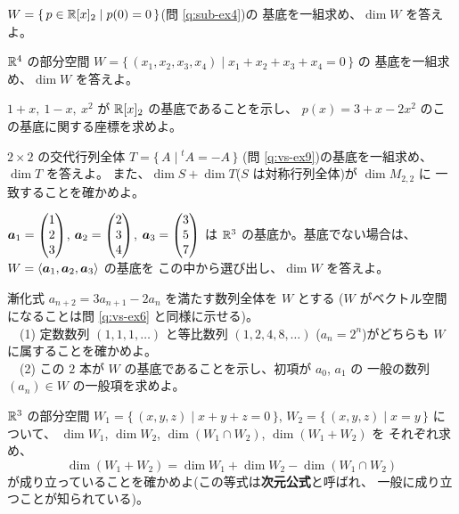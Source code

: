 \begin{mondai}[基本]\label{q:dim-ex4}
$W = \{\, p \in \mathbb{R}[x]_2 \mid p(0) = 0 \,\}$(問 \ref{q:sub-ex4})の
基底を一組求め、$\dim W$ を答えよ。
\end{mondai}

\begin{mondai}[標準]\label{q:dim-ex5}
$\mathbb{R}^4$ の部分空間
$W = \{\,(x_1, x_2, x_3, x_4) \mid x_1 + x_2 + x_3 + x_4 = 0\,\}$ の
基底を一組求め、$\dim W$ を答えよ。
\end{mondai}

\begin{mondai}[標準]\label{q:dim-ex6}
$1 + x,\ 1 - x,\ x^2$ が $\mathbb{R}[x]_2$ の基底であることを示し、
$p(x) = 3 + x - 2x^2$ のこの基底に関する座標を求めよ。
\end{mondai}

\begin{mondai}[標準]\label{q:dim-ex7}
$2 \times 2$ の交代行列全体 $T = \{\, A \mid {}^t\!A = -A \,\}$
(問 \ref{q:vs-ex9})の基底を一組求め、$\dim T$ を答えよ。
また、$\dim S + \dim T$($S$ は対称行列全体)が $\dim M_{2,2}$ に
一致することを確かめよ。
\end{mondai}

\begin{mondai}[標準]\label{q:dim-ex8}
$\bm{a}_1 = \begin{pmatrix}1 \\ 2 \\ 3\end{pmatrix}$, $\bm{a}_2 = \begin{pmatrix}2 \\ 3 \\ 4\end{pmatrix}$,
$\bm{a}_3 = \begin{pmatrix}3 \\ 5 \\ 7\end{pmatrix}$ は $\mathbb{R}^3$ の基底か。基底でない場合は、
$W = \langle \bm{a}_1, \bm{a}_2, \bm{a}_3 \rangle$ の基底を
この中から選び出し、$\dim W$ を答えよ。
\end{mondai}

\begin{mondai}[発展]\label{q:dim-ex9}
漸化式 $a_{n+2} = 3a_{n+1} - 2a_n$ を満たす数列全体を $W$ とする
($W$ がベクトル空間になることは問 \ref{q:vs-ex6} と同様に示せる)。\\
　(1) 定数数列 $(1, 1, 1, \dots)$ と等比数列 $(1, 2, 4, 8, \dots)$
($a_n = 2^n$)がどちらも $W$ に属することを確かめよ。\\
　(2) この $2$ 本が $W$ の基底であることを示し、初項が $a_0$, $a_1$ の
一般の数列 $(a_n) \in W$ の一般項を求めよ。
\end{mondai}

\begin{mondai}[発展]\label{q:dim-ex10}
$\mathbb{R}^3$ の部分空間
$W_1 = \{\,(x, y, z) \mid x + y + z = 0\,\}$,
$W_2 = \{\,(x, y, z) \mid x = y\,\}$ について、
$\dim W_1$, $\dim W_2$, $\dim (W_1 \cap W_2)$, $\dim (W_1 + W_2)$ を
それぞれ求め、
\[
\dim(W_1 + W_2) = \dim W_1 + \dim W_2 - \dim(W_1 \cap W_2)
\]
が成り立っていることを確かめよ(この等式は\textbf{次元公式}と呼ばれ、
一般に成り立つことが知られている)。
\end{mondai}

